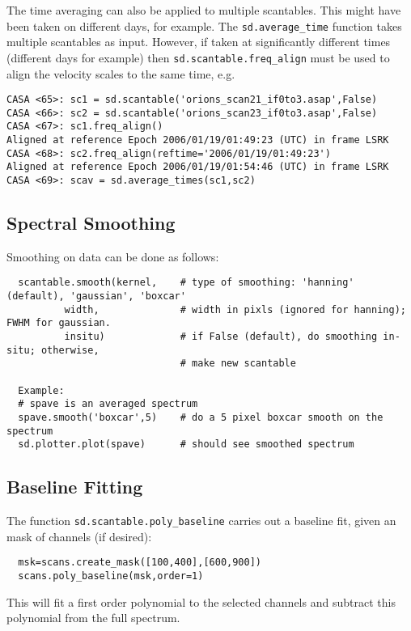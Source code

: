 The time averaging can also be applied to multiple scantables.  This
might have been taken on different days, for example.  The
{\tt sd.average\_time} function takes multiple scantables as input.
However, if taken at significantly different times (different days for
example) then {\tt sd.scantable.freq\_align} must be used to align
the velocity scales to the same time, e.g.
\small
\begin{verbatim}
CASA <65>: sc1 = sd.scantable('orions_scan21_if0to3.asap',False)
CASA <66>: sc2 = sd.scantable('orions_scan23_if0to3.asap',False)
CASA <67>: sc1.freq_align()
Aligned at reference Epoch 2006/01/19/01:49:23 (UTC) in frame LSRK
CASA <68>: sc2.freq_align(reftime='2006/01/19/01:49:23')
Aligned at reference Epoch 2006/01/19/01:54:46 (UTC) in frame LSRK
CASA <69>: scav = sd.average_times(sc1,sc2)
\end{verbatim}
\normalsize

\subsection{Spectral Smoothing}
\label{subsection:sd.asap.smoothing}

Smoothing on data can be done as follows:

\small
\begin{verbatim}
  scantable.smooth(kernel,    # type of smoothing: 'hanning' (default), 'gaussian', 'boxcar'
          width,              # width in pixls (ignored for hanning); FWHM for gaussian.
          insitu)             # if False (default), do smoothing in-situ; otherwise, 
                              # make new scantable

  Example:
  # spave is an averaged spectrum
  spave.smooth('boxcar',5)    # do a 5 pixel boxcar smooth on the spectrum
  sd.plotter.plot(spave)      # should see smoothed spectrum
\end{verbatim}
\normalsize

\subsection{Baseline Fitting}
\label{subsection:sd.asap.BLfitting}

The function {\tt sd.scantable.poly\_baseline} carries out a
baseline fit, given an mask of channels (if desired):
\small
\begin{verbatim}
  msk=scans.create_mask([100,400],[600,900])
  scans.poly_baseline(msk,order=1)
\end{verbatim}
\normalsize
This will fit a first order polynomial to the selected channels and
subtract this polynomial from the full spectrum.

